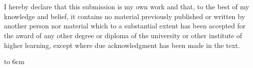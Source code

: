 {~}\vspace{12cm}

\begin{minipage}{0.25\textwidth}~\end{minipage}
\begin{minipage}{0.69\textwidth}
I hereby declare that this submission is my own work and that, to the best of my knowledge and belief, it contains no material previously published or written by another person nor material which to a substantial extent has been accepted for the award of any other degree or diploma of the university or other institute of higher learning, except where due acknowledgment has been made in the text.

\bigskip\bigskip

\hfill\hbox to 6cm{\dotfill}
\end{minipage}
